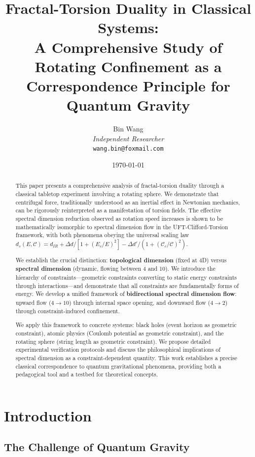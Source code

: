 \documentclass[12pt,a4paper]{article}
\title{\textbf{Fractal-Torsion Duality in Classical Systems:}\\
\textbf{A Comprehensive Study of Rotating Confinement as a Correspondence Principle for Quantum Gravity}}
\author{Bin Wang\\
\textit{Independent Researcher}\\
\texttt{wang.bin@foxmail.com}}
\date{\today}
\begin{document}
\maketitle

\begin{abstract}
This paper presents a comprehensive analysis of fractal-torsion duality through a classical tabletop experiment involving a rotating sphere. We demonstrate that centrifugal force, traditionally understood as an inertial effect in Newtonian mechanics, can be rigorously reinterpreted as a manifestation of torsion fields. The effective spectral dimension reduction observed as rotation speed increases is shown to be mathematically isomorphic to spectral dimension flow in the UFT-Clifford-Torsion framework, with both phenomena obeying the universal scaling law $d_s(E, \mathcal{C}) = d_{IR} + \Delta d/[1+(E_c/E)^2] - \Delta d'/(1+(\mathcal{C}_c/\mathcal{C})^2)$.

We establish the crucial distinction: \textbf{topological dimension} (fixed at 4D) versus \textbf{spectral dimension} (dynamic, flowing between 4 and 10). We introduce the hierarchy of constraints---geometric constraints converting to static energy constraints through interactions---and demonstrate that all constraints are fundamentally forms of energy. We develop a unified framework of \textbf{bidirectional spectral dimension flow}: upward flow ($4 \to 10$) through internal space opening, and downward flow ($4 \to 2$) through constraint-induced confinement.

We apply this framework to concrete systems: black holes (event horizon as geometric constraint), atomic physics (Coulomb potential as geometric constraint), and the rotating sphere (string length as geometric constraint). We propose detailed experimental verification protocols and discuss the philosophical implications of spectral dimension as a constraint-dependent quantity. This work establishes a precise classical correspondence to quantum gravitational phenomena, providing both a pedagogical tool and a testbed for theoretical concepts.
\end{abstract}

\tableofcontents
\newpage

\section{Introduction}
\label{sec:intro}

\subsection{The Challenge of Quantum Gravity}
\end{document}
